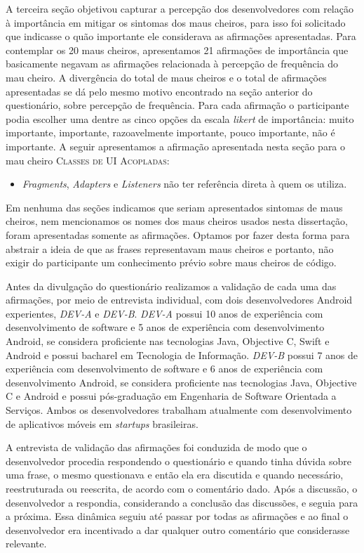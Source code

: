 A terceira seção objetivou capturar a percepção dos desenvolvedores com relação à importância em mitigar os sintomas dos maus cheiros, para isso foi solicitado que indicasse o quão importante ele considerava as afirmações apresentadas. Para contemplar os 20 maus cheiros, apresentamos 21 afirmações de importância que basicamente negavam as afirmações relacionada à percepção de frequência do mau cheiro. A divergência do total de maus cheiros e o total de afirmações apresentadas se dá pelo mesmo motivo encontrado na seção anterior do questionário, sobre percepção de frequência. Para cada afirmação o participante podia escolher uma dentre as cinco opções da escala \textit{likert} de importância: muito importante, importante, razoavelmente importante, pouco importante, não é importante. A seguir apresentamos a afirmação apresentada nesta seção para o mau cheiro \textsc{\small Classes de UI Acopladas}:

\begin{itemize}
  \item \textit{Fragments}, \textit{Adapters} e \textit{Listeners} não ter referência direta à quem os utiliza.
\end{itemize}

Em nenhuma das seções indicamos que seriam apresentados sintomas de maus cheiros, nem mencionamos os nomes dos maus cheiros usados nesta dissertação, foram apresentadas somente as afirmações. Optamos por fazer desta forma para abstrair a ideia de que as frases representavam maus cheiros e portanto, não exigir do participante um conhecimento prévio sobre maus cheiros de código.

Antes da divulgação do questionário realizamos a validação de cada uma das afirmações, por meio de entrevista individual, com dois desenvolvedores Android experientes, \emph{DEV-A} e \emph{DEV-B}. \emph{DEV-A} possui 10 anos de experiência com desenvolvimento de software e 5 anos de experiência com desenvolvimento Android, se considera proficiente nas tecnologias Java, Objective C, Swift e Android e possui bacharel em Tecnologia de Informação. \emph{DEV-B} possui 7 anos de experiência com desenvolvimento de software e 6 anos de experiência com desenvolvimento Android, se considera proficiente nas tecnologias Java, Objective C e Android e possui pós-graduação em Engenharia de Software Orientada a Serviços. Ambos os desenvolvedores trabalham atualmente com desenvolvimento de aplicativos móveis em \textit{startups} brasileiras. 

A entrevista de validação das afirmações foi conduzida de modo que o desenvolvedor procedia respondendo o questionário e quando tinha dúvida sobre uma frase, o mesmo questionava e então ela era discutida e quando necessário, reestruturada ou reescrita, de acordo com o comentário dado. Após a discussão, o desenvolvedor a respondia, considerando a conclusão das discussões, e seguia para a próxima. Essa dinâmica seguiu até passar por todas as afirmações e ao final o desenvolvedor era incentivado a dar qualquer outro comentário que considerasse relevante. 

